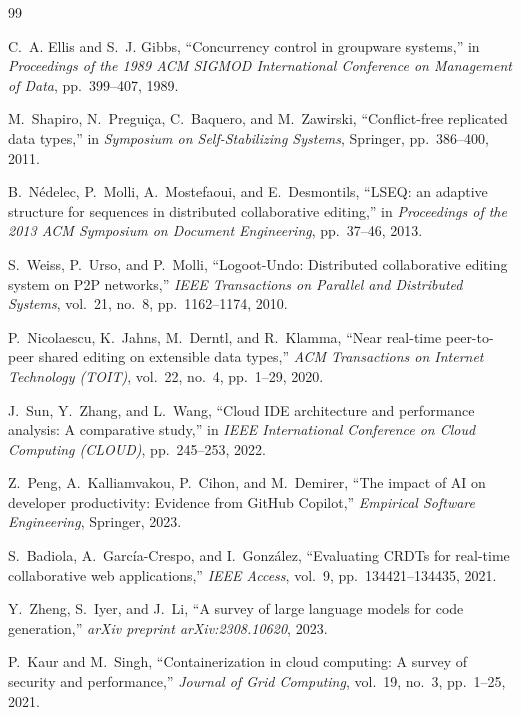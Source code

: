 \documentclass[12pt,a4paper,oneside]{report}
\begin{document}
\begin{thebibliography}{99}

C.~A. Ellis and S.~J. Gibbs, ``Concurrency control in groupware systems,'' in \textit{Proceedings of the 1989 ACM SIGMOD International Conference on Management of Data}, pp.~399--407, 1989.

M.~Shapiro, N.~Pregui\c{c}a, C.~Baquero, and M.~Zawirski, ``Conflict-free replicated data types,'' in \textit{Symposium on Self-Stabilizing Systems}, Springer, pp.~386--400, 2011.

B.~N\'edelec, P.~Molli, A.~Mostefaoui, and E.~Desmontils, ``LSEQ: an adaptive structure for sequences in distributed collaborative editing,'' in \textit{Proceedings of the 2013 ACM Symposium on Document Engineering}, pp.~37--46, 2013.

S.~Weiss, P.~Urso, and P.~Molli, ``Logoot-Undo: Distributed collaborative editing system on P2P networks,'' \textit{IEEE Transactions on Parallel and Distributed Systems}, vol.~21, no.~8, pp.~1162--1174, 2010.

P.~Nicolaescu, K.~Jahns, M.~Derntl, and R.~Klamma, ``Near real-time peer-to-peer shared editing on extensible data types,'' \textit{ACM Transactions on Internet Technology (TOIT)}, vol.~22, no.~4, pp.~1--29, 2020.

J.~Sun, Y.~Zhang, and L.~Wang, ``Cloud IDE architecture and performance analysis: A comparative study,'' in \textit{IEEE International Conference on Cloud Computing (CLOUD)}, pp.~245--253, 2022.

Z.~Peng, A.~Kalliamvakou, P.~Cihon, and M.~Demirer, ``The impact of AI on developer productivity: Evidence from GitHub Copilot,'' \textit{Empirical Software Engineering}, Springer, 2023.

S.~Badiola, A.~Garc\'ia-Crespo, and I.~Gonz\'alez, ``Evaluating CRDTs for real-time collaborative web applications,'' \textit{IEEE Access}, vol.~9, pp.~134421--134435, 2021.

Y.~Zheng, S.~Iyer, and J.~Li, ``A survey of large language models for code generation,'' \textit{arXiv preprint arXiv:2308.10620}, 2023.

P.~Kaur and M.~Singh, ``Containerization in cloud computing: A survey of security and performance,'' \textit{Journal of Grid Computing}, vol.~19, no.~3, pp.~1--25, 2021.


\end{thebibliography}
\end{document}
